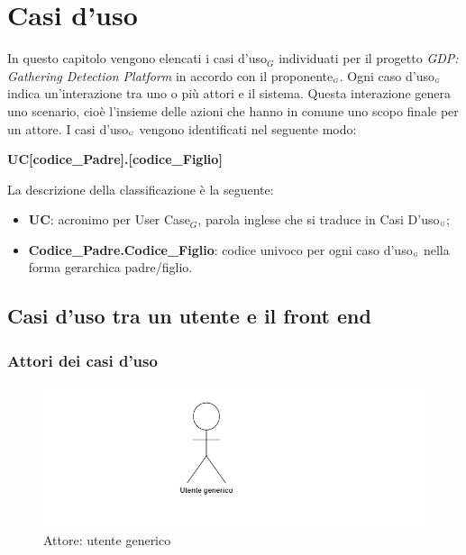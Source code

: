 \chapter{Casi d'uso}\label{CasiDUso}
In questo capitolo vengono elencati i casi d'uso$_G$ individuati per il progetto \textit{GDP: Gathering Detection Platform} in accordo con il proponente$_{\scaleto{G}{3pt}}$. Ogni caso d'uso$_{\scaleto{G}{3pt}}$ indica un'interazione tra uno o più attori e il sistema. Questa interazione genera uno scenario, cioè l'insieme delle azioni che hanno in comune uno scopo finale per un attore. I casi d'uso$_{\scaleto{G}{3pt}}$ vengono identificati nel seguente modo:
\begin{center}
	\textbf{UC[codice\_Padre].[codice\_Figlio]}
\end{center}
La descrizione della classificazione è la seguente:
\begin{itemize}
	\item \textbf{UC}: acronimo per User Case$_G$, parola inglese che si traduce in Casi D'uso$_{\scaleto{G}{3pt}}$;
	\item \textbf{Codice\_Padre.Codice\_Figlio}: codice univoco per ogni caso d'uso$_{\scaleto{G}{3pt}}$ nella forma gerarchica padre/figlio.
\end{itemize}

\section{Casi d'uso tra un utente e il front end}\label{CasiDUsoCasiDUsoTraUnUtenteEIlFrontEnd}
\subsection{Attori dei casi d'uso}\label{CasiDUsoCasiDUsoTraUnUtenteEIlFrontEndAttoriDeiCasiDUso}
\begin{center}
	\begin{figure}[H]
		\includegraphics{../immagini/attori_casi/utente_generico.png}
		\caption{Attore: utente generico}
	\end{figure}
\end{center}
